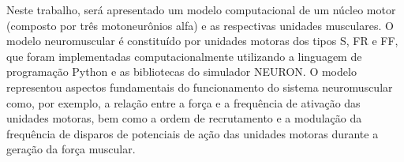Neste trabalho, será apresentado um modelo computacional de um núcleo motor (composto por três motoneurônios alfa) e as respectivas unidades musculares. O modelo neuromuscular é constituído por unidades motoras dos tipos S, FR e FF, que foram implementadas computacionalmente utilizando a linguagem de programação Python e as bibliotecas do simulador NEURON. O modelo representou aspectos fundamentais do funcionamento do sistema neuromuscular como, por exemplo, a relação entre a força e a frequência de ativação das unidades motoras, bem como a ordem de recrutamento e a modulação da frequência de disparos de potenciais de ação das unidades motoras durante a geração da força muscular.